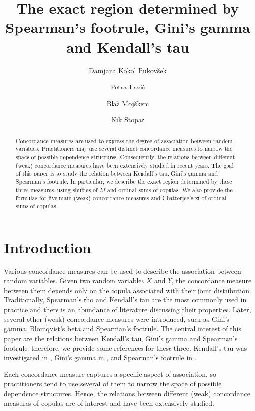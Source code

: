 \documentclass[12pt,a4paper]{amsart}
\title[The exact region determined by $\phi$, $\gamma$ and $\tau$]{The exact region determined by Spearman's footrule, Gini's gamma and Kendall's tau}
\author[D. Kokol Bukovšek]{Damjana Kokol Bukovšek \orcidlink{0000-0002-0098-6784} }
\author[P. Lazić]{Petra Lazić \orcidlink{0000-0003-3064-773X} }
\author[B. Mojškerc]{Blaž Mojškerc \orcidlink{0000-0001-8096-355X} }
\author[N. Stopar]{Nik Stopar \orcidlink{0000-0002-0004-4957} }
\theoremstyle{definition}
\begin{document}
\begin{abstract}
Concordance measures are used to express the degree of association between random variables. Practitioners may use several distinct concordance measures to narrow the space of possible dependence structures. Consequently, the relations between different (weak) concordance measures have been extensively studied in recent years. The goal of this paper is to study the relation between Kendall's tau, Gini's gamma and Spearman's footrule. In particular,  we describe the exact region determined by these three measures, using shuffles of $M$ and ordinal sums of copulas. We also provide the formulas for five main (weak) concordance measures  and Chatterjee's xi of ordinal sums of copulas.
\end{abstract}

\maketitle



\section{Introduction}

Various concordance measures can be used to describe the association between random variables.  Given two random variables $X$ and $Y$, the concordance measure between them depends only on the copula associated with their joint distribution. Traditionally, Spearman's rho and Kendall's tau are the most commonly used in practice and there is an abundance of literature discussing their properties. Later, several other (weak) concordance measures were introduced, such as Gini's gamma, Blomqvist's beta and Spearman's footrule. The central interest of this paper are the relations between Kendall's tau, Gini's gamma and Spearman's footrule, therefore, we provide some references for these three. 
Kendall's tau was investigated in \cite{FuSch2,JaMa,KGJT,Wys},
Gini's gamma in \cite{CoNi,GeNeGh,Nels1998},
and Spearman's footrule in \cite{DiaGra,GeNeGh,UbFl,SSQ}.

Each concordance measure captures a specific aspect of association, so practitioners tend to use several of them to narrow the space of possible dependence structures. Hence, the relations between different (weak) concordance measures of copulas are of interest and have been extensively studied.
\end{document}
